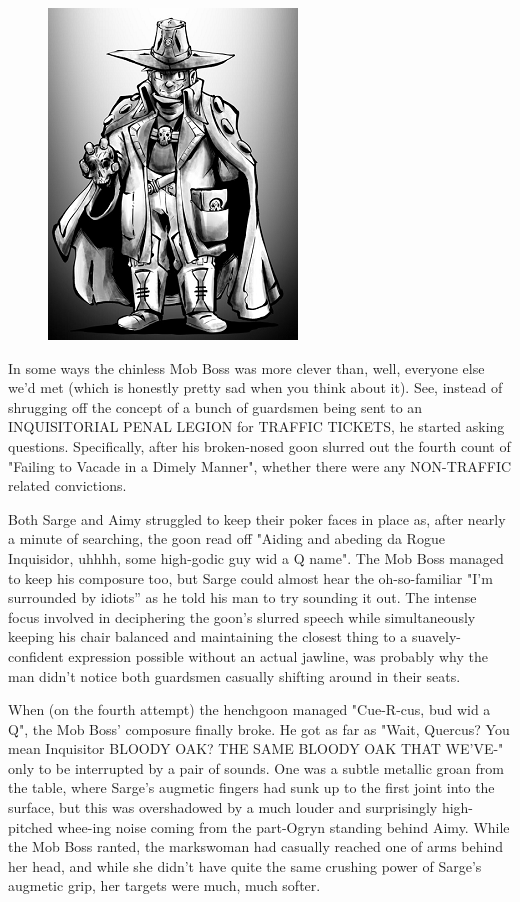 \begin{figure}
	\begin{center}
		\includegraphics[width=\figwidth]{pics/21/46.png}
	\end{center}
\end{figure}
In some ways the chinless Mob Boss was more clever than, well, everyone else we'd met (which is honestly pretty sad when you think about it). 
See, instead of shrugging off the concept of a bunch of guardsmen being sent to an INQUISITORIAL PENAL LEGION for TRAFFIC TICKETS, he started asking questions. 
Specifically, after his broken-nosed goon slurred out the fourth count of "Failing to Vacade in a Dimely Manner", whether there were any NON-TRAFFIC related convictions.

Both Sarge and Aimy struggled to keep their poker faces in place as, after nearly a minute of searching, the goon read off "Aiding and abeding da Rogue Inquisidor, uhhhh, some high-godic guy wid a Q name". 
The Mob Boss managed to keep his composure too, but Sarge could almost hear the oh-so-familiar "I'm surrounded by idiots'' as he told his man to try sounding it out. 
The intense focus involved in deciphering the goon's slurred speech while simultaneously keeping his chair balanced and maintaining the closest thing to a suavely-confident expression possible without an actual jawline, was probably why the man didn't notice both guardsmen casually shifting around in their seats.

When (on the fourth attempt) the henchgoon managed "Cue-R-cus, bud wid a Q", the Mob Boss' composure finally broke. 
He got as far as "Wait, Quercus? 
You mean Inquisitor BLOODY OAK? 
THE SAME BLOODY OAK THAT WE'VE-" only to be interrupted by a pair of sounds. 
One was a subtle metallic groan from the table, where Sarge's augmetic fingers had sunk up to the first joint into the surface, but this was overshadowed by a much louder and surprisingly high-pitched whee-ing noise coming from the part-Ogryn standing behind Aimy. 
While the Mob Boss ranted, the markswoman had casually reached one of arms behind her head, and while she didn't have quite the same crushing power of Sarge's augmetic grip, her targets were much, much softer.

